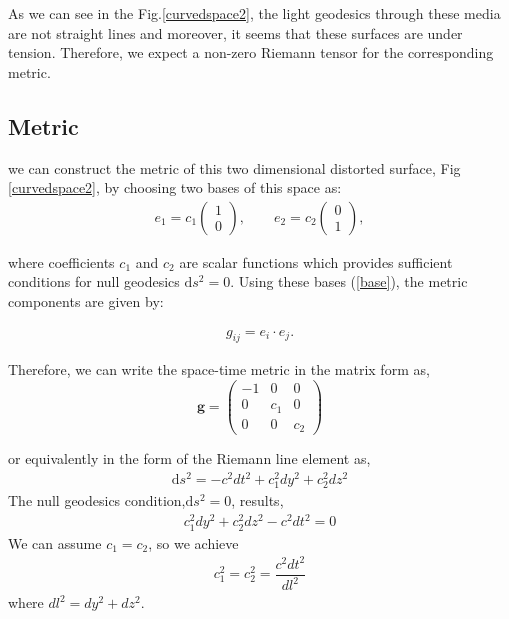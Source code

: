 \documentclass[9pt,twocolumn,twoside]{osajnl}
\begin{document}
As we can see in the Fig.\ref{curvedspace2}, the light geodesics through these media are not straight lines and moreover, it seems that these surfaces are under tension. Therefore, we expect a non-zero Riemann tensor for the corresponding metric.  
 
\subsection{Metric}
 
we can construct the  metric of  this two dimensional distorted surface, Fig \ref{curvedspace2}, by choosing two bases of this space as:
\begin{eqnarray}\label{base}
e_{1}=c_{1}
\begin{pmatrix}
1\\0
\end{pmatrix}, \qquad
e_{2}=c_{2}
\begin{pmatrix}
0\\1
\end{pmatrix},
\end{eqnarray}

 where coefficients $c_{1}$ and $c_{2}$  are scalar functions which provides sufficient conditions for null geodesics  $\mathrm{d}s^{2}=0$. Using these bases (\ref{base}), the metric components \cite{leonhardt2012geometry} are  given by:
 
\begin{eqnarray}
g_{ij}=e_{i}\cdot e_{j}.
\end{eqnarray}

Therefore, we can write the space-time metric in the matrix form as,   
\begin{equation}
\mathbf{g}=
\begin{pmatrix}
-1&0&0\\
0&c_{1}&0\\
0&0&c_{2}
\end{pmatrix}
\end{equation}

or equivalently in the form of the Riemann line element as,
\begin{eqnarray}\label{gl}
\mathrm{d}s^{2}=-c^{2}dt^{2}+c_{1}^{2} dy^{2} +c_{2}^{2} dz^{2}
\end{eqnarray}
The null geodesics condition,$\mathrm{d}s^{2}=0$,  results,
\begin{eqnarray}
 c_{1}^{2} dy^{2} +c_{2}^{2} dz^{2}-c^{2}dt^{2}=0
\end{eqnarray}
We can assume $c_{1}=c_{2}$, so we achieve
\begin{eqnarray}\label{c1c2}
c_{1}^{2}=c_{2}^{2} =\dfrac{c^{2}dt^{2}}{dl^{2}}
\end{eqnarray}
where $dl^{2}=dy^{2}+dz^{2}$.
\end{document}

